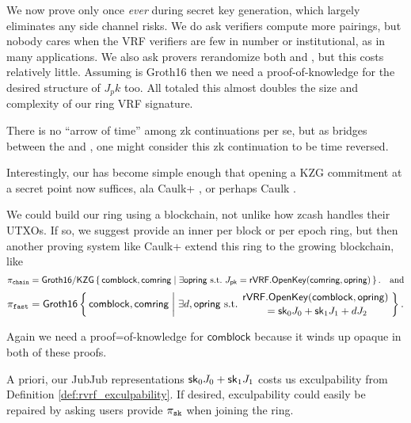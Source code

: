 We now prove \pisk only once {\it ever} during secret key generation,
which largely eliminates any side channel risks.
We do ask verifiers compute more pairings, but nobody cares when
the VRF verifiers are few in number or institutional,
 as in many applications.
We also ask provers rerandomize both \pisk and \pipk, but this costs relatively little.
Assuming \pipk is Groth16 then we need a proof-of-knowledge for the desired structure of $J_pk$ too.
All totaled this almost doubles the size and complexity of our ring VRF signature.

There is no ``arrow of time'' among zk continuations per se, but
as \pisk bridges between the \PedVRF and \pipk,
one might consider this zk continuation to be time reversed.

Interestingly, our \pipk has become simple enough that opening
a KZG commitment \cite{KZG} at a secret point now suffices,
 ala Caulk+ \cite{caulk+}, or perhaps Caulk \cite{caulk}.

\smallskip

\def\comblock{\ensuremath{\mathsf{comblock}}\xspace}
\newcommand\pichain{\ensuremath{\pi_{\mathtt{chain}}}\xspace}

We could build our ring using a blockchain,
 not unlike how zcash handles their UTXOs.
If so, we suggest \pifast provide an inner per block or per epoch ring,
but then another proving system like Caulk+ \cite{caulk+}
 extend this ring to the growing blockchain, like
%
$$ \pichain = \rrSNARKweak \Setst{ \comblock, \comring }{
	\exists \openring \textrm{\ s.t.\ }
	J_\pk = \rVRF.\OpenKey(\comring,\openring)
} \mathcomma \quad\textrm{and} $$ 
%
$$ \pifast = \rrSNARK \Setst{ \comblock, \comring }{
	\exists d,\openring \textrm{\ s.t.\ }
	\genfrac{}{}{0pt}{}{ \rVRF.\OpenKey(\comblock,\openring) }{ \,\, = \sk_0 \genJ_0 + \sk_1 \genJ_1 + d \genJ_2 }
} \mathperiod $$  

Again we need a proof=of-knowledge for \comblock because it winds up opaque
 in both of these proofs. 

\smallskip

A priori, our JubJub representations $\mathsf{sk}_0 J_0 + \mathsf{sk}_1 J_1$
costs us exculpability from Definition \ref{def:rvrf_exculpability}.
If desired, exculpability could easily be repaired by asking users
provide $\pi_{\mathtt{sk}}$ when joining the ring.



\endinput

